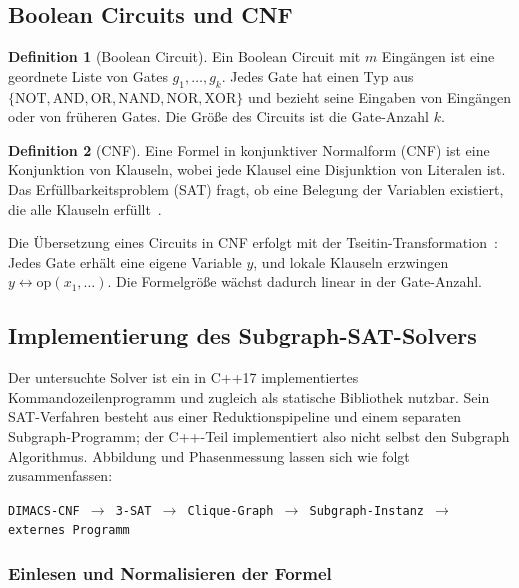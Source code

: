 \documentclass[a4paper,12pt]{article}
\theoremstyle{definition}
\newtheorem{definition}{Definition}
\begin{document}
\subsection{Boolean Circuits und CNF}

\begin{definition}[Boolean Circuit]
	Ein Boolean Circuit mit $m$ Eingängen ist eine geordnete Liste von Gates $g_1, \ldots, g_k$. Jedes Gate hat einen Typ aus $\{\mathrm{NOT}, \mathrm{AND}, \mathrm{OR}, \mathrm{NAND}, \mathrm{NOR}, \mathrm{XOR}\}$ und bezieht seine Eingaben von Eingängen oder von früheren Gates. Die Größe des Circuits ist die Gate-Anzahl $k$.
\end{definition}

\begin{definition}[CNF]
	Eine Formel in konjunktiver Normalform (CNF) ist eine Konjunktion von Klauseln, wobei jede Klausel eine Disjunktion von Literalen ist. Das Erfüllbarkeitsproblem (SAT) fragt, ob eine Belegung der Variablen existiert, die alle Klauseln erfüllt~\cite{cook1971}.
\end{definition}

Die Übersetzung eines Circuits in CNF erfolgt mit der Tseitin-Transformation~\cite{tseitin1968}: Jedes Gate erhält eine eigene Variable $y$, und lokale Klauseln erzwingen $y \leftrightarrow \mathrm{op}(x_1, \ldots)$. Die Formelgröße wächst dadurch linear in der Gate-Anzahl.

\subsection{Implementierung des Subgraph-SAT-Solvers}
\label{sec:solver-impl}

Der untersuchte Solver ist ein in C++17 implementiertes Kommandozeilenprogramm und zugleich als statische Bibliothek nutzbar. Sein SAT-Verfahren besteht aus einer Reduktionspipeline und einem separaten Subgraph-Programm; der C++-Teil implementiert also nicht selbst den Subgraph Algorithmus. Abbildung und Phasenmessung lassen sich wie folgt zusammenfassen:

\begin{center}
\texttt{DIMACS-CNF $\rightarrow$ 3-SAT $\rightarrow$ Clique-Graph $\rightarrow$ Subgraph-Instanz $\rightarrow$ externes Programm}
\end{center}

\subsubsection{Einlesen und Normalisieren der Formel}
\end{document}
